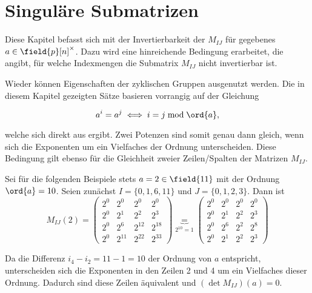 \section{Singuläre Submatrizen}

Diese Kapitel befasst sich mit der Invertierbarkeit der $M_{IJ}$ für gegebenes $a \in \field{p}[n]^\times$. Dazu wird eine hinreichende Bedingung erarbeitet, die angibt, für welche Indexmengen die Submatrix $M_{IJ}$ nicht invertierbar ist. 

Wieder können Eigenschaften der zyklischen Gruppen ausgenutzt werden. Die in diesem Kapitel gezeigten Sätze basieren vorrangig auf der Gleichung

\begin{equation*}
    a^i = a^j \iff i = j \bmod \ord{a},
\end{equation*}

welche sich direkt aus  ergibt. Zwei Potenzen sind somit genau dann gleich, wenn sich die Exponenten um ein Vielfaches der Ordnung unterscheiden. Diese Bedingung gilt ebenso für die Gleichheit zweier Zeilen/Spalten der Matrizen $M_{IJ}$. 

Sei für die folgenden Beispiele stets $a = 2 \in \field{11}$ mit der Ordnung $\ord{a} = 10$. Seien zunächst $I=\{0,1,6,11\}$ und $J=\{0,1,2,3\}$. Dann ist 
\begin{equation*}
    M_{IJ}(2) = \begin{pmatrix}
        2^{0} & 2^{0} & 2^{0} & 2^{0} \\
        2^{0} & 2^{1} & 2^{2} & 2^{3} \\
        2^{0} & 2^{6} & 2^{12} & 2^{18} \\
        2^{0} & 2^{11} & 2^{22} & 2^{33} 
    \end{pmatrix} \underbrace{=}_{2^{10}=1} \begin{pmatrix}
        2^{0} & 2^{0} & 2^{0} & 2^{0} \\
        2^{0} & 2^{1} & 2^{2} & 2^{3} \\
        2^{0} & 2^{6} & 2^{2} & 2^{8} \\
        2^{0} & 2^{1} & 2^{2} & 2^{3} 
    \end{pmatrix}
\end{equation*}

Da die Differenz $i_4 - i_2 = 11 - 1 = 10$ der Ordnung von $a$ entspricht, unterscheiden sich die Exponenten in den Zeilen 2 und 4 um ein Vielfaches dieser Ordnung. Dadurch sind diese Zeilen äquivalent und $(\det M_{IJ})(a) = 0$. 

